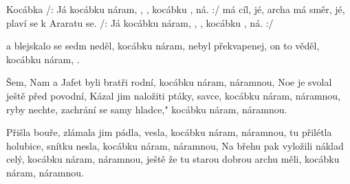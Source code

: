 \begin{TEXT}{Kocábka}
\REFREN /: Já  kocábku náram, , , 
kocábku , ná. :/
 má cíl, jé, archa má směr, jé, 
plaví se k Araratu  se. 
/: Já  kocábku náram, , , 
kocábku , ná. :/

\SLOKA {} a blejskalo se sedm neděl, 
kocábku náram,  
 nebyl překvapenej, on to věděl, 
kocábku náram, . 

\SLOKA Šem, Nam a Jafet byli bratři rodní, 
kocábku náram, náramnou, 
Noe je svolal ještě před povodní,
Kázal jim naložiti ptáky, savce, 
kocábku náram, náramnou, 
ryby nechte, zachrání se samy hladce," 
kocábku náram, náramnou.


\SLOKA Přišla bouře, zlámala jim pádla, vesla, 
kocábku náram, náramnou, 
tu přilétla holubice, snítku nesla, 
kocábku náram, náramnou,
Na břehu pak vyložili náklad celý, 
kocábku náram, náramnou, 
ještě že tu starou dobrou archu měli, 
kocábku náram, náramnou. 

\end{TEXT}